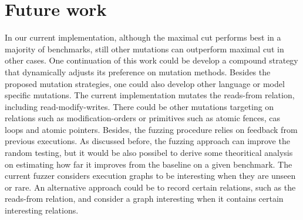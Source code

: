 \section{Future work}

In our current implementation, although the maximal cut performs best in a majority of benchmarks, still other mutations can outperform maximal cut in other cases. One continuation of this work could be develop a compound strategy that dynamically adjusts its preference on mutation methods. Besides the proposed mutation strategies, one could also develop other language or model specific mutations. The current implementation mutates the reads-from relation, including read-modify-writes. There could be other mutations targeting on relations such as modification-orders or primitives such as atomic fences, cas loops and atomic pointers. Besides, the fuzzing procedure relies on feedback from previous executions. As discussed before, the fuzzing approach can improve the random testing, but it would be also possibel to derive some theoritical analysis on estimating how far it improves from the baseline on a given benchmark. The current fuzzer considers execution graphs to be interesting when they are unseen or rare. An alternative approach could be to record certain relations, such as the reads-from relation, and consider a graph interesting when it contains certain interesting relations.
